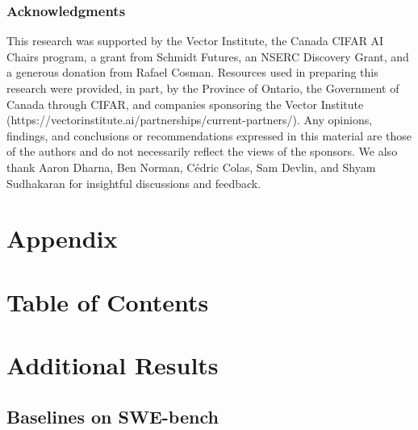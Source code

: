 \documentclass{article}
\begin{document}
\newpage





\subsubsection*{Acknowledgments}
This research was supported by the Vector Institute, the Canada CIFAR AI Chairs program, a grant from Schmidt Futures, an NSERC Discovery Grant, and a generous donation from Rafael Cosman. Resources used in preparing this research were provided, in part, by the Province of Ontario, the Government of Canada through CIFAR, and companies sponsoring the Vector Institute (https://vectorinstitute.ai/partnerships/current-partners/). Any opinions, findings, and conclusions or recommendations expressed in this material are those of the authors and do not necessarily reflect the views of the sponsors. We also thank Aaron Dharna, Ben Norman, Cédric Colas, Sam Devlin, and Shyam Sudhakaran for insightful discussions and feedback.




\clearpage
\appendix


\section*{\LARGE Appendix}

\section*{Table of Contents}

\startcontents[sections]

\clearpage

\section{Additional Results}
\label{app:add-results}
\subsection{Baselines on SWE-bench}
\label{app:plots-swe}
\end{document}
